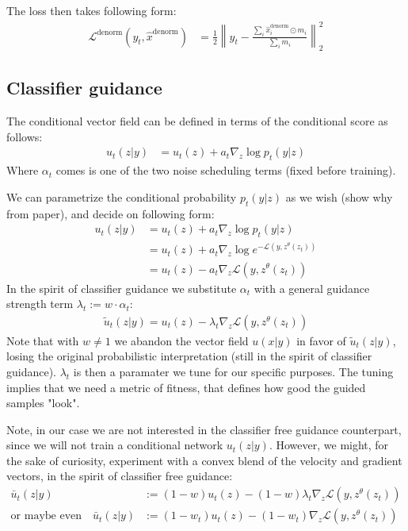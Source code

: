 \documentclass[a4paper,12pt]{article}
\begin{document}
The loss then takes following form:
\begin{align*}
\mathcal{L}^\text{denorm}(y_t, \hat{x}^\text{denorm}) &=  \frac{1}{2} \left\lVert y_t - \frac{\sum_i \hat{x}^\text{denorm}_i \odot m_i}{\sum_i m_i} \right\lVert^2_2
\end{align*}

\subsection{Classifier guidance}
The conditional vector field can be defined in terms of the conditional score as follows:
\begin{align*}
     u_t(z|y) &=  u_t(z) + a_t \nabla_{z} \log p_t(y|z) 
\end{align*}
Where $\alpha_t$ comes is one of the two noise scheduling terms (fixed before training). 

We can parametrize the conditional probability $p_t(y|z)$ as we wish (show why from paper), and decide on following form: 
\begin{align*}
    u_t(z|y) &=  u_t(z) + a_t \nabla_{z} \log p_t(y|z) \\ &= u_t(z) + a_t \nabla_{z} \log e^{-\mathcal{L}(y, z^\theta(z_t))} \\
    &= u_t(z) - a_t \nabla_{z}\mathcal{L}(y, z^\theta(z_t))
\end{align*}
In the spirit of classifier guidance we substitute $\alpha_t$ with a general guidance strength term $\lambda_t:= w\cdot \alpha_t$:
\begin{align*}
    \tilde{u}_t(z|y) = u_t(z) - \lambda_t \nabla_{z}\mathcal{L}(y, z^\theta(z_t)) 
\end{align*}
Note that with $w\neq 1$ we abandon the vector field $u(x|y)$ in favor of $\tilde{u}_t(z|y)$, losing the original probabilistic interpretation (still in the spirit of classifier guidance).
$\lambda_t$ is then a paramater we tune for our specific purposes. The tuning implies that we need a metric of fitness, that defines how good the guided samples "look".

Note, in our case we are not interested in the classifier free guidance counterpart, since we will not train a conditional network $u_t(z|y)$. However, we might, for the sake of curiosity, experiment with a convex blend of the velocity and gradient vectors, in the spirit of classifier free guidance:
\begin{align*}
    \bar{u}_t(z|y) &:= (1-w)u_t(z) - (1-w)\lambda_t \nabla_{z}\mathcal{L}(y, z^\theta(z_t)) \\
    \text{or maybe even} \quad \bar{u}_t(z|y) &:= (1-w_t)u_t(z) - (1-w_t) \nabla_{z}\mathcal{L}(y, z^\theta(z_t)) 
\end{align*}
\end{document}
